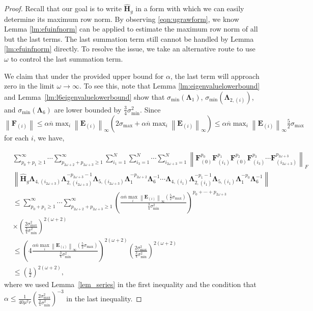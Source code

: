\documentclass[twoside,11pt]{article}
\newcommand{\norm}[1]{\left\lVert#1\right\rVert}
\newcommand{\matE}{\mathbf{E}}
\newcommand{\matF}{\mathbf{F}}
\newcommand{\hmatH}{{\hat{\mathbf{H}}}{}}
\newcommand{\matLambda}{\mathbf{\Lambda}}
\newcommand{\gop}{\sigma_{\max}}
\newcommand{\fracud}{\frac{1}{2}}
\newcommand{\bn}{{\overline{n}}}
\newcommand{\abnb}{\alpha \bn\max_{i}\norm{\matE_{(i)}}_{\infty}}
\newcommand{\sms}{\sigma_{\min}^2}
\newcommand{\brtkappa}{\left(\frac{2\gop^2}{\frac{3}{4}\sms}\right)}
\begin{document}
\begin{proof}
Recall that our goal is to write $\hmatH_g$ in a form with which we can easily determine its maximum row norm. By observing \eqref{eqn:ugrawform}, we know Lemma \ref{lm:efuinfnorm} can be applied to estimate the maximum row norm of all but the last terms. The last summation term still cannot be handled by Lemma \ref{lm:efuinfnorm} directly. To resolve the issue, we take an alternative route to use $\omega$ to control the last summation term.

We claim that under the provided upper bound for $\alpha$, the last term will approach zero in the limit $\omega\to \infty$. To see this, note that Lemma \ref{lm:eigenvaluelowerbound} and Lemma~\ref{lm:l6eigenvaluelowerbound} show that $\sigma_{\min}(\matLambda_{1})$,  $\sigma_{\min}(\matLambda_{2,(i)})$, and $\sigma_{\min}(\matLambda_{6})$ are lower bounded by $\frac{3}{4}\sms$. Since $\norm{\matF_{(i)}}\le \abnb(2\gop+\abnb)\le \abnb \frac{5}{2}\gop$ for each $i$, we have,

\begin{align*}
&\sum_{p_0+p_1\ge 1}^{\infty}\cdots\sum_{p_{2\omega+2}+p_{2\omega+3}\ge 1}^{\infty}\sum_{i_1=1}^{N}\sum_{i_3=1}^{N}\cdots\sum_{i_{2\omega+3}=1}^{N}\norm{\matF_{(0)}^{p_0}\matF_{(i_1)}^{p_1}\matF_{(0)}^{p_2}\matF_{(i_3)}^{p_3}\cdots \matF_{(i_{2\omega+3})}^{p_{2\omega+3}}}_F\\
&\norm{\hmatH_{g}\matLambda_{4,(i_{2\omega+3})}\matLambda_{2,(i_{2\omega+3})}^{-p_{2\omega+3}-1}\matLambda_{5,(i_{2\omega+3})}\matLambda_{1}^{-p_{2\omega+2}}\matLambda_6^{-1}\cdots \matLambda_{4,(i_{1})}\matLambda_{2,(i_{1})}^{-p_{1}-1}\matLambda_{5,(i_{1})}\matLambda_{1}^{-p_0}\matLambda_6^{-1}}\\
&\le \sum_{p_0+p_1\ge 1}^{\infty}\cdots\sum_{p_{2\omega+2}+p_{2\omega+3}\ge 1}^{\infty}\left(\frac{\abnb\left(\frac{5}{2}\gop\right)}{\frac{3}{4}\sms}\right)^{p_0+\cdots+p_{2\omega+3}}\\
&\times \left(\frac{2\gop^2}{\frac{3}{4}\sms}\right)^{2\left(\omega+2\right)}\\
&\le \left(4 \frac{\abnb\left(\frac{5}{2}\gop\right)}{\frac{3}{4}\sms}\right)^{2\left(\omega+2\right)}\left(\frac{2\gop^2}{\frac{3}{4}\sms}\right)^{2\left(\omega+2\right)}\\
&\le\left(\fracud\right)^{2(\omega+2)},
\end{align*}
where we used Lemma~\ref{lem_series} in the first inequality and the condition that $\alpha \le \frac{1}{40\mu^2 r}\brtkappa^{-3}$ in the last inequality.





\end{proof}
\end{document}
